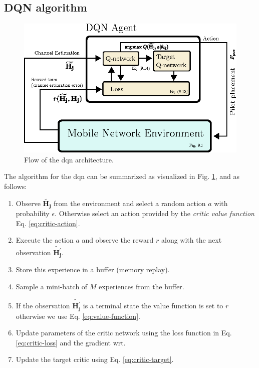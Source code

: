 \subsection{DQN algorithm}\label{subsec:dqn_algorithm}
\begin{figure}
    \centering
    \includegraphics[width=\textwidth]{chapters/part_uplink/figures/RL_dqn_architecture_simplified.eps}
    \caption{Flow of the \gls{dqn} architecture.}
    \label{fig:dqn_architecture_simplified}
\end{figure}

The algorithm for the \gls{dqn} can be summarized as visualized in Fig. \ref{fig:dqn_architecture_simplified}, and as follows: 


\begin{enumerate}
    \item Observe $\mathbf{\widetilde{H_j}}$ from the environment and select a random action $a$ with probability $\epsilon$. Otherwise select an action provided by the \emph{critic value function} Eq. \ref{eq:critic-action}.
    \item Execute the action $a$ and observe the reward $r$ along with the next observation $\mathbf{\widetilde{H_j^{'}}}$.
    \item Store this experience in a buffer (memory replay).
    \item Sample a mini-batch of $M$ experiences from the buffer.
    \item If the observation $\mathbf{\widetilde{H_j^{'}}}$ is a terminal state the value function is set to $r$ otherwise we use Eq. \ref{eq:value-function}.
    \item Update parameters of the critic network using the loss function in Eq. \ref{eq:critic-loss} and the gradient wrt. 
    \item Update the target critic using Eq. \ref{eq:critic-target}.
\end{enumerate}

